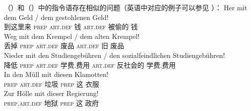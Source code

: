\begin{exe}
\begin{xlist}[iv.]
\begin{exe}
\begin{xlist}[iv.]
（）和（）中的指令语存在相似的问题（英语中对应的例子可以参见 ）：
\eal
\label{Beispiel-Direktiva}
\ex 
\gll Her  mit  dem Geld   / dem gestohlenen Geld!\\
     到这里来 \textsc{prep} \textsc{art}.\textsc{def} 钱 {} \textsc{art}.\textsc{def} 被偷的 钱\\
\ex 
\gll Weg  mit  dem Krempel / dem alten Krempel!\\
     丢掉 \textsc{prep} \textsc{art}.\textsc{def} 废品   {} \textsc{art}.\textsc{def} 旧 废品\\
\ex 
\gll Nieder mit den Studiengebühren / den sozialfeindlichen Studiengebühren!\\
     降低 \textsc{prep} \textsc{art}.\textsc{def} 学费.费用  {} \textsc{art}.\textsc{def} 反社会的 学费.费用\\
\zl
\eal
\ex 
\gll In den Müll mit diesen Klamotten!\\
     \textsc{prep} \textsc{art}.\textsc{def} 垃圾 \textsc{prep} 这 衣服\\
\ex 
\gll Zur Hölle mit dieser Regierung!\\
	 \textsc{prep}.\textsc{art}.\textsc{def} 地狱 \textsc{prep} 这 政府\\

\end{xlist}
\end{exe}
\end{xlist}
\end{exe}
